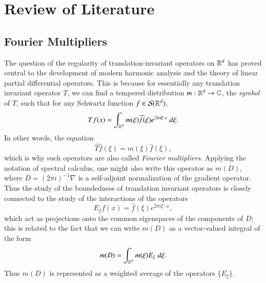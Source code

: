 \part{Review of Literature}

\chapter{Fourier Multipliers}

The question of the regularity of translation-invariant operators on $\operatorname{\mathbb{R}}^d$ has proved central to the development of modern harmonic analysis and the theory of linear partial differential operators. This is because for essentially any translation invariant operator $T$, we can find a tempered distribution $m: \operatorname{\mathbb{R}}^d \to \operatorname{\mathbb{C}}$, the \emph{symbol} of $T$, such that for any Schwartz function $f \in \mathcal{S}(\operatorname{\mathbb{R}}^d)$,
%
\[ Tf(x) = \int_{\operatorname{\mathbb{R}}^d} m(\xi) \widehat{f}(\xi) e^{2 \pi i \xi \cdot x}\; d\xi. \]
%
In other words, the equation
%
\[ \widehat{Tf}(\xi) = m(\xi) \widehat{f}(\xi), \]
%
which is why such operators are also called \emph{Fourier multipliers}. Applying the notation of spectral calculus, one might also write this operator as $m(D)$, where $D = (2 \pi i)^{-1} \nabla$ is a self-adjoint normalization of the gradient operator. Thus the study of the boundedness of translation invariant operators is closely connected to the study of the interactions of the operators
%
\[ E_\xi f(x) = \widehat{f}(\xi) e^{2 \pi i \xi \cdot x}, \]
%
which act as projections onto the common eigenspaces of the components of $D$; this is related to the fact that we can write $m(D)$ as a vector-valued integral of the form
%
\[ m(D) = \int_{\operatorname{\mathbb{R}}^d} m(\xi) E_\xi\; d\xi. \]
%
Thus $m(D)$ is represented as a weighted average of the operators $\{ E_\xi \}$.

